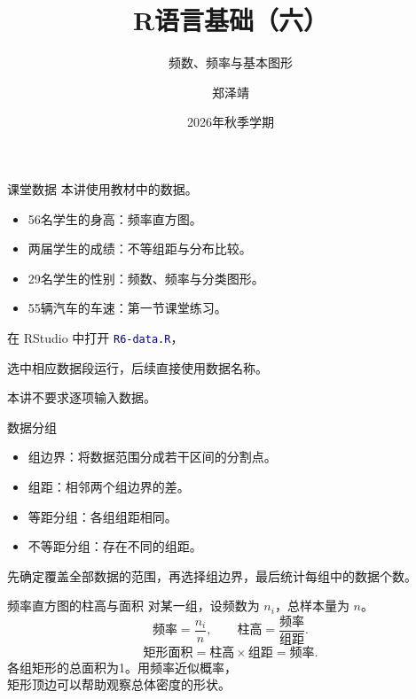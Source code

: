 \documentclass[14pt,compress,t,noamsthm,notheorem,table,handout,fontset=none]{ctexbeamer}
\title{R语言基础（六）}
\subtitle{频数、频率与基本图形}
\author{郑泽靖}
\institute{北京师范大学统计学院}
\date{2026年秋季学期}
\newcommand{\code}[1]{\textcolor{navy}{\texttt{#1}}}
\begin{document}
\begin{frame}[plain]
  \titlepage
\end{frame}

\begin{frame}{课堂数据}
  本讲使用教材中的数据。
  \begin{itemize}
    \item 56名学生的身高：频率直方图。
    \item 两届学生的成绩：不等组距与分布比较。
    \item 29名学生的性别：频数、频率与分类图形。
    \item 55辆汽车的车速：第一节课堂练习。
  \end{itemize}
  \medskip
  在 RStudio 中打开 \code{R6-data.R}，\par
  选中相应数据段运行，后续直接使用数据名称。\par
  本讲不要求逐项输入数据。
\end{frame}

\begin{frame}{数据分组}
  \begin{itemize}
    \item 组边界：将数据范围分成若干区间的分割点。
    \item 组距：相邻两个组边界的差。
    \item 等距分组：各组组距相同。
    \item 不等距分组：存在不同的组距。
  \end{itemize}
  \medskip
  先确定覆盖全部数据的范围，再选择组边界，最后统计每组中的数据个数。
\end{frame}

\begin{frame}{频率直方图的柱高与面积}
  对某一组，设频数为 $n_i$，总样本量为 $n$。
  \[
    \text{频率}=\frac{n_i}{n},\qquad
    \text{柱高}=\frac{\text{频率}}{\text{组距}}.
  \]
  \[
    \text{矩形面积}=\text{柱高}\times\text{组距}=\text{频率}.
  \]
  各组矩形的总面积为1。用频率近似概率，\\
  矩形顶边可以帮助观察总体密度的形状。
\end{frame}
\end{document}

